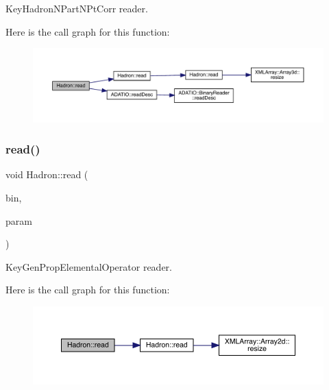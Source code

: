 Key\+Hadron\+N\+Part\+N\+Pt\+Corr reader. 

Here is the call graph for this function\+:
\nopagebreak
\begin{figure}[H]
\begin{center}
\leavevmode
\includegraphics[width=350pt]{d1/daf/namespaceHadron_a51412e3f2ebc9c4d67ed1cc397c4d546_cgraph}
\end{center}
\end{figure}
\mbox{\label{namespaceHadron_ac6d19c651cf61c129b5cf86c15d13ab5}} 
\subsubsection{\texorpdfstring{read()}{read()}\hspace{0.1cm}{\footnotesize\ttfamily [56/94]}}
{\footnotesize\ttfamily void Hadron\+::read (\begin{DoxyParamCaption}\item[{\mbox{\hyperlink{classADATIO_1_1BinaryReader}{Binary\+Reader}} \&}]{bin,  }\item[{\mbox{\hyperlink{structHadron_1_1KeyGenPropElementalOperator__t}{Key\+Gen\+Prop\+Elemental\+Operator\+\_\+t}} \&}]{param }\end{DoxyParamCaption})}



Key\+Gen\+Prop\+Elemental\+Operator reader. 

Here is the call graph for this function\+:
\nopagebreak
\begin{figure}[H]
\begin{center}
\leavevmode
\includegraphics[width=350pt]{d1/daf/namespaceHadron_ac6d19c651cf61c129b5cf86c15d13ab5_cgraph}
\end{center}
\end{figure}
\mbox{\label{namespaceHadron_ae34c01603f5e8f9246374fddfaa8e062}} 
